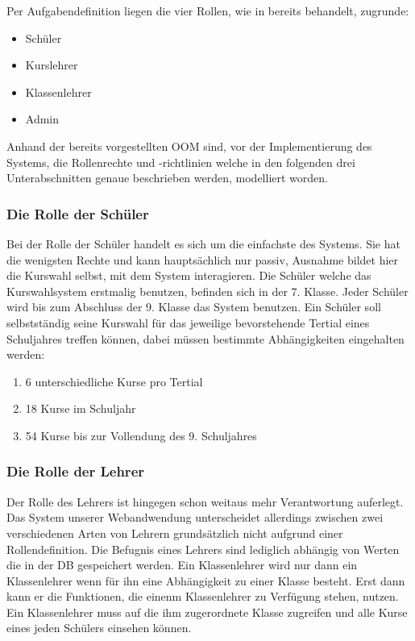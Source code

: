\documentclass[12pt, twoside, a4paper, ngerman]{article}
\begin{document}
Per Aufgabendefinition liegen die vier Rollen, wie in  bereits behandelt, zugrunde:

\begin{itemize}
  \item Schüler
  \item Kurslehrer
  \item Klassenlehrer
  \item Admin
\end{itemize}

Anhand der bereits vorgestellten \ac{OOM} sind, vor der Implementierung des Systems, die Rollenrechte und -richtlinien welche in den folgenden drei Unterabschnitten genaue beschrieben werden, modelliert worden.

\subsubsection{Die Rolle der Schüler}

Bei der Rolle der Schüler handelt es sich um die einfachste des Systems. 
Sie hat die wenigsten Rechte und kann hauptsächlich nur passiv, Ausnahme bildet hier die Kurswahl selbst, mit dem System interagieren.
Die Schüler welche das Kurswahlsystem erstmalig benutzen, befinden sich in der 7. Klasse. Jeder Schüler wird bis zum Abschluss der 9. Klasse das System benutzen.
Ein Schüler soll selbstständig seine Kurswahl für das jeweilige bevorstehende Tertial eines Schuljahres treffen können, dabei müssen bestimmte Abhängigkeiten eingehalten werden:

\begin{enumerate}
  \item 6 unterschiedliche Kurse pro Tertial
  \item 18 Kurse im Schuljahr
  \item 54 Kurse bis zur Vollendung des 9. Schuljahres
\end{enumerate}

\subsubsection{Die Rolle der Lehrer}

Der Rolle des Lehrers ist hingegen schon weitaus mehr Verantwortung auferlegt.
Das System unserer Webandwendung unterscheidet allerdings zwischen zwei verschiedenen Arten von Lehrern grundsätzlich nicht aufgrund einer Rollendefinition. 
Die Befugnis eines Lehrers sind lediglich abhängig von Werten die in der \ac{DB} gespeichert werden. 
Ein Klassenlehrer wird nur dann ein Klassenlehrer wenn für ihn eine Abhängigkeit zu einer Klasse besteht. 
Erst dann kann er die Funktionen, die einenm Klassenlehrer zu Verfügung stehen, nutzen.
Ein Klassenlehrer muss auf die ihm zugerordnete Klasse zugreifen und alle Kurse eines jeden Schülers einsehen können.
\end{document}
